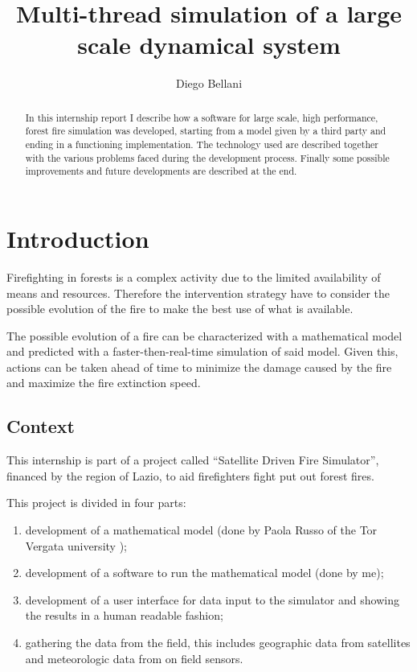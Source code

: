 \documentclass[Lau]{sapthesis} %
\title{Multi-thread simulation of a large scale dynamical system}
\author{Diego Bellani}
\let\oldsection\section
\def\subsection{\oldsection}
\def\section{\chapter}
\begin{document}
\frontmatter
\maketitle

\begin{abstract}
In this internship report I describe how a software for large scale, high
performance, forest fire simulation was developed, starting from a model given
by a third party and ending in a functioning implementation. The technology used
are described together with the various problems faced during the development
process. Finally some possible improvements and future developments are
described at the end.
\end{abstract}

\tableofcontents
\listoffigures
\listoftables

\mainmatter

\section{Introduction}%

Firefighting in forests is a complex activity due to the limited availability of
means and resources. Therefore the intervention strategy have to consider the
possible evolution of the fire to make the best use of what is available.

The possible evolution of a fire can be characterized with a mathematical model
and predicted with a faster-then-real-time simulation of said model. Given
this, actions can be taken ahead of time to minimize the damage caused by the
fire and maximize the fire extinction speed.

\subsection{Context}

This internship is part of a project called ``Satellite Driven Fire Simulator'',
financed by the region of Lazio, to aid firefighters fight put out forest fires.

This project is divided in four parts:

\begin{enumerate}
\item development of a mathematical model (done by Paola Russo of the Tor
Vergata university \cite{mod});
\item \label{enum:my_work} development of a software to run the mathematical
model (done by me);
\item \label{enum:interaction} development of a user interface for data input
to the simulator and showing the results in a human readable fashion;
\item \label{enum:data} gathering the data from the field, this includes
geographic data from satellites \cite{cop} and meteorologic data from on field
sensors.
\end{enumerate}
\end{document}
